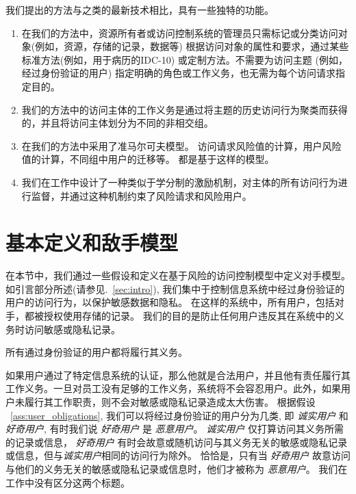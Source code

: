 我们提出的方法与\cite{wang2011quantified,shaikh2012dynamic,choi2015framework}之类的最新技术相比，具有一些独特的功能。

\begin{enumerate}
	\item 在我们的方法中，资源所有者或访问控制系统的管理员只需标记或分类访问对象(例如，资源，存储的记录，数据等) 根据访问对象的属性和要求，通过某些标准方法(例如，用于病历的IDC-10) 或定制方法。不需要为访问主题 (例如，经过身份验证的用户) 指定明确的角色或工作义务，也无需为每个访问请求指定目的。
	\item 我们的方法中的访问主体的工作义务是通过将主题的历史访问行为聚类而获得的，并且将访问主体划分为不同的非相交组。
	\item 在我们的方法中采用了准马尔可夫模型。 访问请求风险值的计算，用户风险值的计算，不同组中用户的迁移等。 都是基于这样的模型。
	\item 我们在工作中设计了一种类似于学分制的激励机制，对主体的所有访问行为进行监督，并通过这种机制约束了风险请求和风险用户。
\end{enumerate}

\section{基本定义和敌手模型}
\label{sec:adversary_model}

在本节中，我们通过一些假设和定义在基于风险的访问控制模型中定义对手模型。 如引言部分所述(请参见.~\ref{sec:intro}), 我们集中于控制信息系统中经过身份验证的用户的访问行为，以保护敏感数据和隐私。 在这样的系统中，所有用户，包括对手，都被授权使用存储的记录。 我们的目的是防止任何用户违反其在系统中的义务时访问敏感或隐私记录。

\begin{assumption}
	\label{ass:user_obligations}
	所有通过身份验证的用户都将履行其义务。
\end{assumption}

如果用户通过了特定信息系统的认证，那么他就是合法用户，并且他有责任履行其工作义务。一旦对员工没有足够的工作义务，系统将不会容忍用户。此外，如果用户未履行其工作职责，则不会对敏感或隐私记录造成太大伤害。 根据假设 ~\ref{ass:user_obligations}, 我们可以将经过身份验证的用户分为几类, 即 \emph{诚实用户} 和 \emph{好奇用户}, 有时我们说 \emph{好奇用户} 是 \emph{恶意用户}。  \emph{诚实用户} 仅打算访问其义务所需的记录或信息，  \emph{好奇用户} 有时会故意或随机访问与其义务无关的敏感或隐私记录或信息，但与\emph{诚实用户}相同的访问行为除外。 恰恰是，只有当 \emph{好奇用户} 故意访问与他们的义务无关的敏感或隐私记录或信息时，他们才被称为 \emph{恶意用户}。 我们在工作中没有区分这两个标题。

